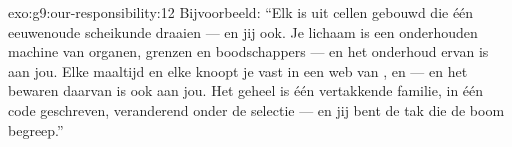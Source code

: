 \begin{solution}{exo:g9:our-responsibility:12}
Bijvoorbeeld: ``Elk  is uit cellen gebouwd die één
eeuwenoude scheikunde draaien --- en jij ook. Je lichaam is een
onderhouden machine van organen, grenzen en boodschappers --- en
het onderhoud ervan is aan jou. Elke maaltijd en elke 
knoopt je vast in een web van ,  en
 --- en het bewaren daarvan is ook aan jou. Het geheel is
één vertakkende familie, in één code geschreven, veranderend onder
de selectie --- en jij bent de tak die de boom begreep.''
\end{solution}

